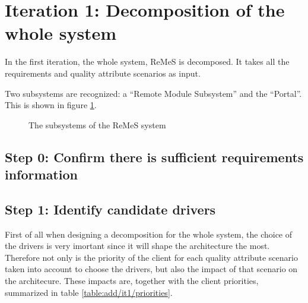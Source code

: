 \section{Iteration 1: Decomposition of the whole system}
\label{add:it1}

\npar In the first iteration, the whole system, ReMeS is decomposed. It takes
all the requirements and quality attribute scenarios as input.

\npar Two subsystems are recognized: a ``Remote Module Subsystem'' and the
``Portal''. This is shown in figure \ref{fig:add/it1/decomposition}.

\begin{figure}[H]
	\begin{centering}
		\caption{The subsystems of the ReMeS system}
		\label{fig:add/it1/decomposition}
	\end{centering}
\end{figure}

\subsection{Step 0: Confirm there is sufficient requirements information} 


\subsection{Step 1: Identify candidate drivers}
\label{add:it1/drivers}


\npar First of all when designing a decomposition for the whole system, the
choice of the drivers is very imortant since it will shape the architecture the
most. Therefore not only is the priority of the client for each quality
attribute scenario taken into account to choose the drivers, but also the impact of
that scenario on the architecure. These impacts are, together with the client
priorities, summarized in table \ref{table:add/it1/priorities}.

